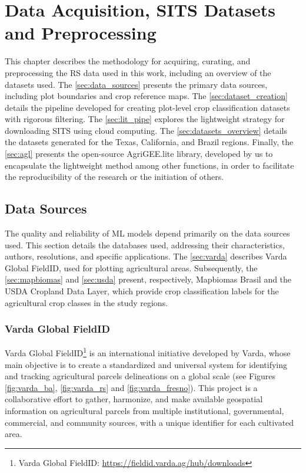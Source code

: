 \chapter{Data Acquisition, SITS Datasets and Preprocessing}
\label{chapter:meth_data}

This chapter describes the methodology for acquiring, curating, and preprocessing the RS data used in this work, including an overview of the datasets used. The \autoref{sec:data_sources} presents the primary data sources, including plot boundaries and crop reference maps. The \autoref{sec:dataset_creation} details the pipeline developed for creating plot-level crop classification datasets with rigorous filtering. The \autoref{sec:lit_pipe} explores the lightweight strategy for downloading SITS using cloud computing. The \autoref{sec:datasets_overview} details the datasets generated for the Texas, California, and Brazil regions. Finally, the \autoref{sec:agl} presents the open-source AgriGEE.lite library, developed by us to encapsulate the lightweight method among other functions, in order to facilitate the reproducibility of the research or the initiation of others.

\section{Data Sources}\label{sec:data_sources}

The quality and reliability of \ac{ML} models depend primarily on the data sources used. This section details the databases used, addressing their characteristics, authors, resolutions, and specific applications. The \autoref{sec:varda} describes Varda Global FieldID, used for plotting agricultural areas. Subsequently, the \autoref{sec:mapbiomas} and \ref{sec:usda} present, respectively, Mapbiomas Brasil and the USDA Cropland Data Layer, which provide crop classification labels for the agricultural crop classes in the study regions.

\subsection{Varda Global FieldID}
\label{sec:varda}

Varda Global FieldID\footnote{Varda Global FieldID: \url{https://fieldid.varda.ag/hub/downloads}} is an international initiative developed by Varda, whose main objective is to create a standardized and universal system for identifying and tracking agricultural parcels delineations on a global scale (see Figures \ref{fig:varda_ba}, \ref{fig:varda_rs} and \ref{fig:varda_fresno}). This project is a collaborative effort to gather, harmonize, and make available geospatial information on agricultural parcels from multiple institutional, governmental, commercial, and community sources, with a unique identifier for each cultivated area. 

